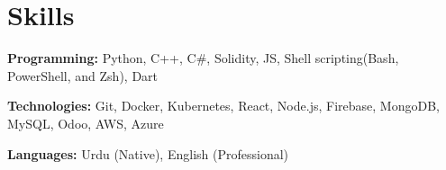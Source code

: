 \documentclass[a4paper]{article}
\newcommand{\resumeSubHeadingListStart}{\begin{itemize}[leftmargin=0.15in, label={}]}
\newcommand{\resumeSubHeadingListEnd}{\end{itemize}}
\begin{document}
\section{Skills}
\vspace{2pt}
\resumeSubHeadingListStart
\small{\item{
		\textbf{Programming:}{ Python, C++, C\#, Solidity, JS, Shell scripting(Bash, PowerShell, and Zsh), Dart} \\ \vspace{3pt}
		
		\textbf{Technologies:}{ Git, Docker, Kubernetes, React, Node.js, Firebase, MongoDB, MySQL, Odoo, AWS, Azure} \\ \vspace{3pt}
		
		\textbf{Languages:}{ Urdu (Native), English (Professional)}
		
}}
\resumeSubHeadingListEnd
\end{document}
